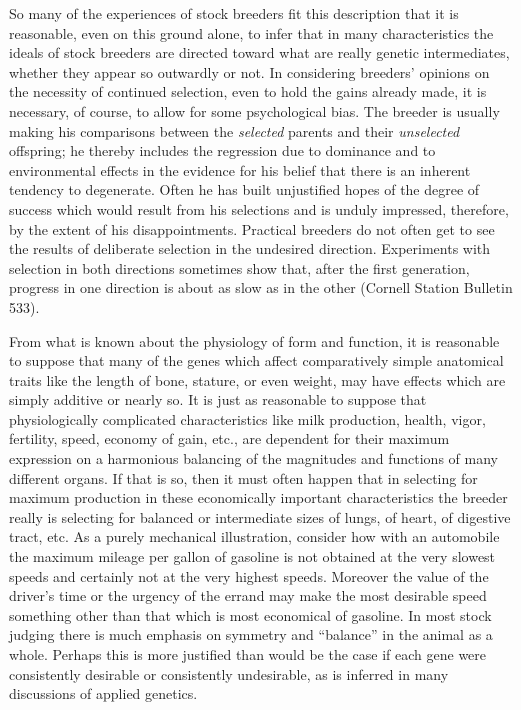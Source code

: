So many of the experiences of stock breeders fit this description that
it is reasonable, even on this ground alone, to infer that in many characteristics
the ideals of stock breeders are directed toward what are really
genetic intermediates, whether they appear so outwardly or not. In considering
breeders' opinions on the necessity of continued selection, even
to hold the gains already made, it is necessary, of course, to allow for
some psychological bias. The breeder is usually making his comparisons
between the \textit{selected} parents and their \textit{unselected} offspring; he thereby
includes the regression due to dominance and to environmental effects
in the evidence for his belief that there is an inherent tendency to
degenerate. Often he has built unjustified hopes of the degree of success
which would result from his selections and is unduly impressed, therefore,
by the extent of his disappointments. Practical breeders do not
often get to see the results of deliberate selection in the undesired direction.
Experiments with selection in both directions sometimes show
that, after the first generation, progress in one direction is about as slow
as in the other (Cornell Station Bulletin 533).

From what is known about the physiology of form and function, it
is reasonable to suppose that many of the genes which affect comparatively
simple anatomical traits like the length of bone, stature, or even
weight, may have effects which are simply additive or nearly so. It is
just as reasonable to suppose that physiologically complicated characteristics
like milk production, health, vigor, fertility, speed, economy of
gain, etc., are dependent for their maximum expression on a harmonious
balancing of the magnitudes and functions of many different
organs. If that is so, then it must often happen that in selecting for
maximum production in these economically important characteristics
the breeder really is selecting for balanced or intermediate sizes of
lungs, of heart, of digestive tract, etc. As a purely mechanical illustration,
consider how with an automobile the maximum mileage per gallon
of gasoline is not obtained at the very slowest speeds and certainly
not at the very highest speeds. Moreover the value of the driver's time
or the urgency of the errand may make the most desirable speed something
other than that which is most economical of gasoline. In most
stock judging there is much emphasis on symmetry and ``balance'' in
the animal as a whole. Perhaps this is more justified than would be the
case if each gene were consistently desirable or consistently undesirable,
as is inferred in many discussions of applied genetics.

